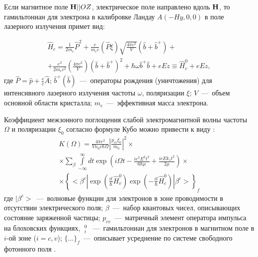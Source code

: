 Если магнитное поле $\boldsymbol{\mathbf{H}}||OZ$, электрическое поле направлено вдоль $\boldsymbol{\mathbf{H}}$, то гамильтониан для электрона в калибровке Ландау $A(-Hy,0,0)$ в поле лазерного излучения примет вид:

\begin{multline} \label{eq:22_10} 
\hat{H}_c =\frac{1}{2m_c } \hat{P}^2 +\frac{e}{m_e c} (\hat{P}\xi )\sqrt{\frac{4\pi c^2 }{V} } (\hat{b}+\hat{b}^+ ) + \\ 
+\frac{e^{2} }{2m_e c^2 } \left(\frac{4\pi c^{2} }{V} \right)(\hat{b}+\hat{b}^+ )^2 +\hbar \omega \hat{b}^+ \hat{b}+eEz\equiv \hat{H}_c^0 +eEz,
\end{multline}
где $\hat{P}=\hat{p}+\frac{e}{c} \hat{A}$; $\hat{b}^+ (\hat{b})$~---~операторы рождения (уничтожения) для интенсивного лазерного излучения частоты $\omega $, поляризации $\xi $; $V$~---~объем основной области кристалла; $m_e $~---~эффективная масса электрона.

Коэффициент межзонного поглощения слабой электромагнитной волны частоты $\Omega $ и поляризации $\xi _{0} $ согласно формуле Кубо \cite{Kubo1957a} можно привести к виду \cite{Sokovnich2004}:
\begin{multline} \label{eq:22_20} 
K(\Omega )=\frac{4\pi e^2 }{V n_0 c\hbar \Omega } \left|\frac{p_{cv} \xi_0 }{m_0 } \right|^2 \times  \\
\times \sum _{\beta } \int\limits_{-\infty }^{\infty} dt \exp \left(i\Omega t-\frac{i e^2 E^2 t^3 }{6\hbar \mu } +\frac{ieEk_z t^2}{2\mu } \right)\times  \\ 
\times \left\{<\beta^c |\exp \left(\frac{it}{\hbar } \hat{H}_v^0 \right)\exp \left(-\frac{it}{\hbar } \hat{H}_c^0 \right)|\beta^c >\right\}_f  
\end{multline} 
где $|\beta^c >$~---~волновые функции для электронов в зоне проводимости в отсутствии электрического поля; $\beta $~---~набор квантовых чисел, описывающих состояние заряженной частицы; $p_{cv} $~---~матричный элемент оператора импульса на блоховских функциях, $\mathop{\hat{H}}\nolimits_i^0 $~---~гамильтониан для электронов в магнитном поле в $i$-ой зоне ($i=c,v$); $\{...\}_f$~---~описывает усреднение по системе свободного фотонного поля \cite{Glauber1963,Klauder1968}. 

